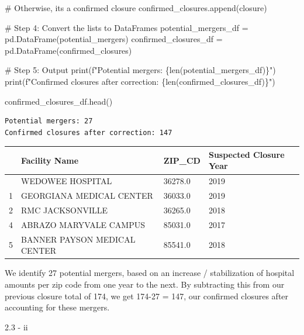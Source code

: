 \documentclass[
  letterpaper,
  DIV=11,
  numbers=noendperiod]{scrartcl}
\newenvironment{Shaded}{\begin{snugshade}}{\end{snugshade}}
\newcommand{\BuiltInTok}[1]{\textcolor[rgb]{0.00,0.23,0.31}{#1}}
\newcommand{\CommentTok}[1]{\textcolor[rgb]{0.37,0.37,0.37}{#1}}
\newcommand{\NormalTok}[1]{\textcolor[rgb]{0.00,0.23,0.31}{#1}}
\newcommand{\OperatorTok}[1]{\textcolor[rgb]{0.37,0.37,0.37}{#1}}
\newcommand{\SpecialCharTok}[1]{\textcolor[rgb]{0.37,0.37,0.37}{#1}}
\newcommand{\SpecialStringTok}[1]{\textcolor[rgb]{0.13,0.47,0.30}{#1}}
\begin{document}
\begin{Shaded}
\begin{Highlighting}[]
    \CommentTok{\# Otherwise, it\textquotesingle{}s a confirmed closure}
\NormalTok{    confirmed\_closures.append(closure)}

\CommentTok{\# Step 4: Convert the lists to DataFrames}
\NormalTok{potential\_mergers\_df }\OperatorTok{=}\NormalTok{ pd.DataFrame(potential\_mergers)}
\NormalTok{confirmed\_closures\_df }\OperatorTok{=}\NormalTok{ pd.DataFrame(confirmed\_closures)}

\CommentTok{\# Step 5: Output}
\BuiltInTok{print}\NormalTok{(}\SpecialStringTok{f"Potential mergers: }\SpecialCharTok{\{}\BuiltInTok{len}\NormalTok{(potential\_mergers\_df)}\SpecialCharTok{\}}\SpecialStringTok{"}\NormalTok{)}
\BuiltInTok{print}\NormalTok{(}\SpecialStringTok{f"Confirmed closures after correction: }\SpecialCharTok{\{}\BuiltInTok{len}\NormalTok{(confirmed\_closures\_df)}\SpecialCharTok{\}}\SpecialStringTok{"}\NormalTok{)}

\NormalTok{confirmed\_closures\_df.head()}
\end{Highlighting}
\end{Shaded}

\begin{verbatim}
Potential mergers: 27
Confirmed closures after correction: 147
\end{verbatim}

\begin{longtable}[]{@{}llll@{}}
\toprule\noalign{}
& Facility Name & ZIP\_CD & Suspected Closure Year \\
\midrule\noalign{}
\endhead
\bottomrule\noalign{}
\endlastfoot
0 & WEDOWEE HOSPITAL & 36278.0 & 2019 \\
1 & GEORGIANA MEDICAL CENTER & 36033.0 & 2019 \\
2 & RMC JACKSONVILLE & 36265.0 & 2018 \\
4 & ABRAZO MARYVALE CAMPUS & 85031.0 & 2017 \\
5 & BANNER PAYSON MEDICAL CENTER & 85541.0 & 2018 \\
\end{longtable}

We identify 27 potential mergers, based on an increase / stabilization
of hospital amounts per zip code from one year to the next. By
subtracting this from our previous closure total of 174, we get 174-27 =
147, our confirmed closures after accounting for these mergers.

2.3 - ii
\end{document}
